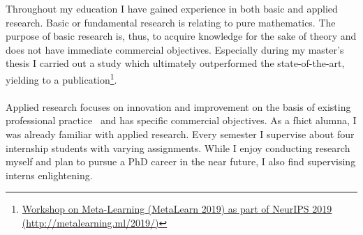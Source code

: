 Throughout my education I have gained experience in both basic and applied research.
Basic or fundamental research is relating to pure mathematics.
The purpose of basic research is, thus, to acquire knowledge for the sake of theory and does not have immediate commercial objectives.
Especially during my master's thesis I carried out a study which ultimately outperformed the state-of-the-art, yielding to a publication\footnote{ 
\href{http://metalearning.ml/2019/}{Workshop on Meta-Learning (MetaLearn 2019) as part of NeurIPS 2019 (http://metalearning.ml/2019/)}}.\\\\
Applied research focuses on innovation and improvement on the basis of existing professional practice~\cite{FHICTResearch} and has specific commercial objectives.
As a \acrshort{fhict} alumna, I was already familiar with applied research. 
Every semester I supervise about four internship students with varying assignments. 
While I enjoy conducting research myself and plan to pursue a PhD career in the near future, I also find supervising interns enlightening.


